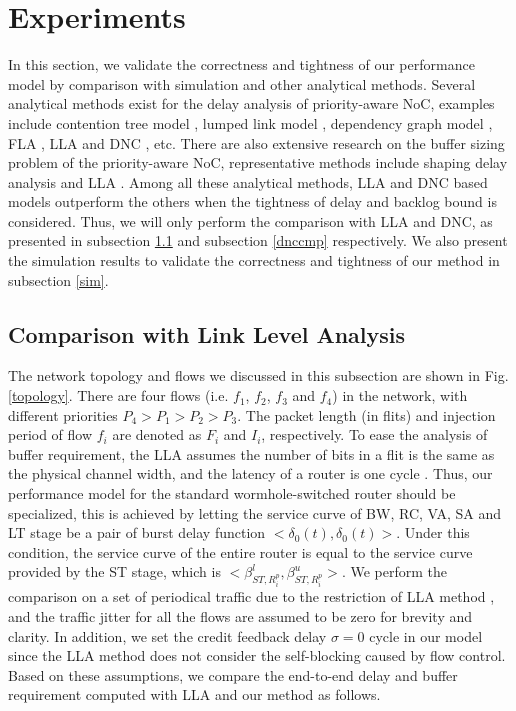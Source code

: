 \documentclass[preprint]{elsarticle}
\begin{document}
\section{Experiments}\label{experiments}
In this section, we validate the correctness and tightness of our performance model by comparison with simulation and other analytical methods. Several analytical methods exist for the delay analysis of priority-aware NoC, examples include contention tree model \cite{LuJS05}, lumped link model \cite{707545}, dependency graph model \cite{708526}, FLA \cite{Shi:2008:RCA:1397757.1397996}, LLA \cite{73} and DNC \cite{Qian489900}, etc. There are also extensive research on the buffer sizing problem of the priority-aware NoC, representative methods include shaping delay analysis \cite{Manolache:2006:BSO:1131481.1131683} and LLA \cite{189}. Among all these analytical methods, LLA \cite{73}\cite{189} and DNC \cite{Qian489900} based models outperform the others when the tightness of delay and backlog bound is considered. Thus, we will only perform the comparison with LLA and DNC, as presented in subsection \ref{llacmp} and subsection \ref{dnccmp} respectively. We also present the simulation results to validate the correctness and tightness of our method in subsection \ref{sim}.

\subsection{Comparison with Link Level Analysis}\label{llacmp}
The network topology and flows we discussed in this subsection are shown in Fig. \ref{topology}. There are four flows (i.e. $f_1$, $f_2$, $f_3$ and $f_4$) in the network, with different priorities $P_4>P_1>P_2>P_3$. The packet length (in flits) and injection period of flow $f_i$ are denoted as $F_i$ and $I_i$, respectively. To ease the analysis of buffer requirement, the LLA assumes the number of bits in a flit is the same as the physical channel width, and the latency of a router is one cycle \cite{189}. Thus, our performance model for the standard wormhole-switched router should be specialized, this is achieved by letting the service curve of BW, RC, VA, SA and LT stage be a pair of burst delay function $<\delta_0(t),\delta_0(t)>$. Under this condition, the service curve of the entire router is equal to the service curve provided by the ST stage, which is $<\beta_{ST,R_i^p}^l,\beta_{ST,R_i^p}^u>$. We perform the comparison on a set of periodical traffic due to the restriction of LLA method \cite{73}\cite{189}, and the traffic jitter for all the flows are assumed to be zero for brevity and clarity. In addition, we set the credit feedback delay $\sigma=0$ cycle in our model since the LLA method does not consider the self-blocking caused by flow control. Based on these assumptions, we compare the end-to-end delay and buffer requirement computed with LLA and our method as follows.
\end{document}
